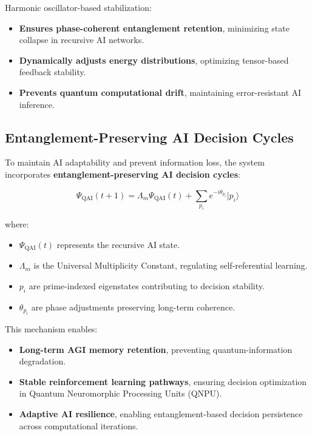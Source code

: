 \documentclass{article}
\theoremstyle{plain}
\begin{document}
Harmonic oscillator-based stabilization:
\begin{itemize}
    \item \textbf{Ensures phase-coherent entanglement retention}, minimizing state collapse in recursive AI networks.
    \item \textbf{Dynamically adjusts energy distributions}, optimizing tensor-based feedback stability.
    \item \textbf{Prevents quantum computational drift}, maintaining error-resistant AI inference.
\end{itemize}

\subsection{Entanglement-Preserving AI Decision Cycles}

To maintain AI adaptability and prevent information loss, the system incorporates \textbf{entanglement-preserving AI decision cycles}:

\begin{equation}
    \Psi_{\text{QAI}}(t+1) = \Lambda_m \Psi_{\text{QAI}}(t) + \sum_{p_i} e^{-i \theta_{p_i}} |p_i\rangle
\end{equation}

where:
\begin{itemize}
    \item \( \Psi_{\text{QAI}}(t) \) represents the recursive AI state.
    \item \( \Lambda_m \) is the Universal Multiplicity Constant, regulating self-referential learning.
    \item \( p_i \) are prime-indexed eigenstates contributing to decision stability.
    \item \( \theta_{p_i} \) are phase adjustments preserving long-term coherence.
\end{itemize}

This mechanism enables:
\begin{itemize}
    \item \textbf{Long-term AGI memory retention}, preventing quantum-information degradation.
    \item \textbf{Stable reinforcement learning pathways}, ensuring decision optimization in Quantum Neuromorphic Processing Units (QNPU).
    \item \textbf{Adaptive AI resilience}, enabling entanglement-based decision persistence across computational iterations.
\end{itemize}
\end{document}
